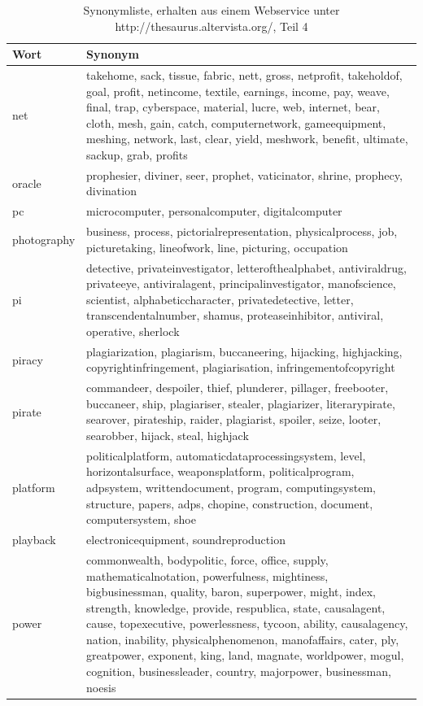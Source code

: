 \documentclass[12pt,a4paper]{report}
\begin{document}
	\begin{table}[H]
\caption{Synonymliste, erhalten aus einem Webservice unter http://thesaurus.altervista.org/, Teil 4 }
\begin{center}
\begin{tabular}{ |l|p{13cm}|}
\hline
\textbf{Wort} & \textbf{Synonym}\\
\hline

net & takehome, sack, tissue, fabric, nett, gross, netprofit, takeholdof, goal, profit, netincome, textile, earnings, income, pay, weave, final, trap, cyberspace, material, lucre, web, internet, bear, cloth, mesh, gain, catch, computernetwork, gameequipment, meshing, network, last, clear, yield, meshwork, benefit, ultimate, sackup, grab, profits\\
\hline
oracle & prophesier, diviner, seer, prophet, vaticinator, shrine, prophecy, divination\\
\hline
pc & microcomputer, personalcomputer, digitalcomputer\\
\hline
photography & business, process, pictorialrepresentation, physicalprocess, job, picturetaking, lineofwork, line, picturing, occupation\\
\hline
pi & detective, privateinvestigator, letterofthealphabet, antiviraldrug, privateeye, antiviralagent, principalinvestigator, manofscience, scientist, alphabeticcharacter, privatedetective, letter, transcendentalnumber, shamus, proteaseinhibitor, antiviral, operative, sherlock\\
\hline
piracy & plagiarization, plagiarism, buccaneering, hijacking, highjacking, copyrightinfringement, plagiarisation, infringementofcopyright\\
\hline
pirate & commandeer, despoiler, thief, plunderer, pillager, freebooter, buccaneer, ship, plagiariser, stealer, plagiarizer, literarypirate, searover, pirateship, raider, plagiarist, spoiler, seize, looter, searobber, hijack, steal, highjack\\
\hline
platform & politicalplatform, automaticdataprocessingsystem, level, horizontalsurface, weaponsplatform, politicalprogram, adpsystem, writtendocument, program, computingsystem, structure, papers, adps, chopine, construction, document, computersystem, shoe\\
\hline
playback & electronicequipment, soundreproduction\\
\hline
power & commonwealth, bodypolitic, force, office, supply, mathematicalnotation, powerfulness, mightiness, bigbusinessman, quality, baron, superpower, might, index, strength, knowledge, provide, respublica, state, causalagent, cause, topexecutive, powerlessness, tycoon, ability, causalagency, nation, inability, physicalphenomenon, manofaffairs, cater, ply, greatpower, exponent, king, land, magnate, worldpower, mogul, cognition, businessleader, country, majorpower, businessman, noesis\\

\end{tabular}
\end{center}
\end{table}
\end{document}

